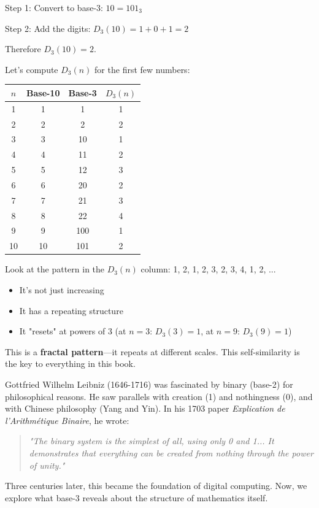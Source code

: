 \begin{example}[Computing $D_3(10)$]
Step 1: Convert to base-3: $10 = 101_3$

Step 2: Add the digits: $D_3(10) = 1 + 0 + 1 = 2$

Therefore $D_3(10) = 2$.
\end{example}

Let's compute $D_3(n)$ for the first few numbers:

\begin{center}
\begin{tabular}{c|c|c|c}
$n$ & Base-10 & Base-3 & $D_3(n)$ \\
\hline
1 & 1 & 1 & 1 \\
2 & 2 & 2 & 2 \\
3 & 3 & 10 & 1 \\
4 & 4 & 11 & 2 \\
5 & 5 & 12 & 3 \\
6 & 6 & 20 & 2 \\
7 & 7 & 21 & 3 \\
8 & 8 & 22 & 4 \\
9 & 9 & 100 & 1 \\
10 & 10 & 101 & 2 \\
\end{tabular}
\end{center}

\begin{intuitive}
Look at the pattern in the $D_3(n)$ column: 1, 2, 1, 2, 3, 2, 3, 4, 1, 2, ...

\begin{itemize}
\item It's not just increasing
\item It has a repeating structure
\item It "resets" at powers of 3 (at $n=3$: $D_3(3)=1$, at $n=9$: $D_3(9)=1$)
\end{itemize}

This is a \textbf{fractal pattern}—it repeats at different scales. This self-similarity is the key to everything in this book.
\end{intuitive}

\begin{historicalnote}
Gottfried Wilhelm Leibniz (1646-1716) was fascinated by binary (base-2) for philosophical reasons. He saw parallels with creation (1) and nothingness (0), and with Chinese philosophy (Yang and Yin). In his 1703 paper \textit{Explication de l'Arithmétique Binaire}, he wrote:

\begin{quote}
\textit{"The binary system is the simplest of all, using only 0 and 1... It demonstrates that everything can be created from nothing through the power of unity."}
\end{quote}

Three centuries later, this became the foundation of digital computing. Now, we explore what base-3 reveals about the structure of mathematics itself.
\end{historicalnote}


